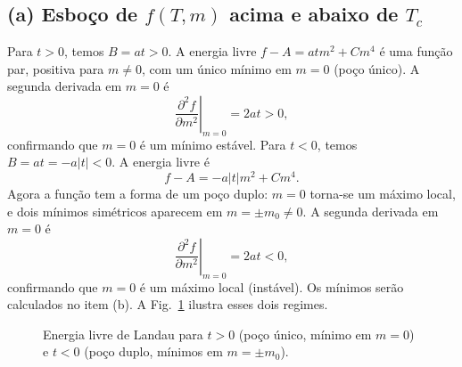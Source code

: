 \documentclass[11pt,a4paper]{article}
\begin{document}
\subsection*{(a) Esboço de $f(T,m)$ acima e abaixo de $T_c$}
%
Para $t > 0$, temos $B = a t > 0$. A energia livre $f-A=atm^2+Cm^4$ é uma função par, positiva para $m\neq0$, com um único mínimo em $m=0$ (poço único). A segunda derivada em $m = 0$ é
%
\begin{equation}
    \left. \frac{\partial^2 f}{\partial m^2} \right|_{m=0} = 2a t > 0,
\end{equation}
%
confirmando que $m = 0$ é um mínimo estável. Para $t < 0$, temos $B = a t = -a |t| < 0$. A energia livre é
%
\begin{equation}
    f - A = -a |t| m^2 + C m^4.
\end{equation}
%
Agora a função tem a forma de um poço duplo: $m = 0$ torna-se um máximo local, e dois mínimos simétricos aparecem em $m = \pm m_0 \neq 0$. A segunda derivada em $m = 0$ é
%
\begin{equation}
    \left. \frac{\partial^2 f}{\partial m^2} \right|_{m=0} = 2a t < 0,
\end{equation}
%
confirmando que $m = 0$ é um máximo local (instável). Os mínimos serão calculados no item (b).
%
A Fig.~\ref{fig:landau_f} ilustra esses dois regimes.
%
\begin{figure}[h]
\centering
{}
\hfill
{}
\caption{Energia livre de Landau para $t > 0$ (poço único, mínimo em $m=0$) e $t < 0$ (poço duplo, mínimos em $m = \pm m_0$).}
\label{fig:landau_f}
\end{figure}
%
\end{document}
